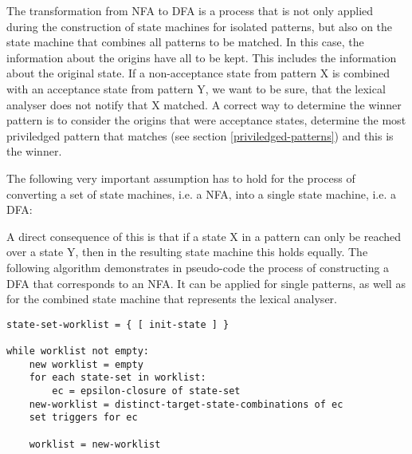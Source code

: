 The transformation from NFA to DFA is a process that is not only applied during
the construction of state machines for isolated patterns, but also on the state
machine that combines all patterns to be matched. In this case, the information
about the origins have all to be kept. This includes the information about the
original state. If a non-acceptance state from pattern X is combined with an
acceptance state from pattern Y, we want to be sure, that the lexical analyser
does not notify that X matched. A correct way to determine the winner pattern
is to consider the origins that were acceptance states, determine the most priviledged
pattern that matches (see section \ref{priviledged-patterns}) and this is the
winner.

The following very important assumption has to hold for the process
of converting a set of state machines, i.e. a NFA, into a single state
machine, i.e. a DFA:


A direct consequence of this is that if a state X in a pattern can only be
reached over a state Y, then in the resulting state machine this holds equally.
The following algorithm demonstrates in pseudo-code the process of constructing
a DFA that corresponds to an NFA. It can be applied for single patterns, as
well as for the combined state machine that represents the lexical analyser.

\begin{lstlisting}
state-set-worklist = { [ init-state ] }

while worklist not empty:
    new worklist = empty
    for each state-set in worklist:
        ec = epsilon-closure of state-set
	new-worklist = distinct-target-state-combinations of ec
	set triggers for ec

    worklist = new-worklist	

\end{lstlisting}
